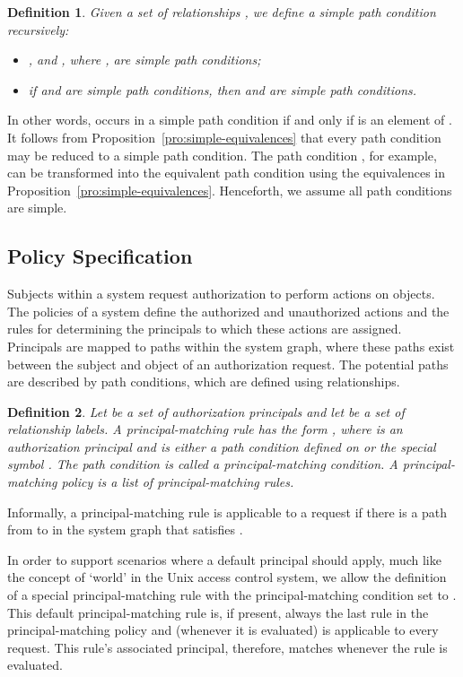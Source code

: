 \documentclass{article}
\newtheorem{definition}{Definition}
\begin{document}
\begin{definition}
   Given a set of relationships , we define a \emph{simple path condition} recursively:
    \begin{itemize}
	\item ,  and , where , are simple path conditions;
        \item if  and  are simple path conditions, then  and  are simple path conditions.
    \end{itemize}
\end{definition}

In other words,  occurs in a simple path condition if and only if  is an element of .
It follows from Proposition~\ref{pro:simple-equivalences} that every path condition may be reduced to a simple path condition.
The path condition , for example, can be transformed into the equivalent path condition  using the equivalences in Proposition~\ref{pro:simple-equivalences}.
Henceforth, we assume all path conditions are simple.


\subsection{Policy Specification}\label{sec:AuthZModel:PolicySpec}

Subjects within a system request authorization to perform actions on objects. The policies of a system define the authorized and unauthorized actions and the rules for determining the principals to which these actions are assigned. Principals are mapped to paths within the system graph, where these paths exist between the subject and object of an authorization request. The potential paths are described by path conditions, which are defined using relationships.

\begin{definition}
     Let  be a set of \emph{authorization principals} and let  be a set of relationship labels.
     A \emph{principal-matching rule} has the form , where  is an authorization principal and  is either a path condition defined on  or the special symbol .
     The path condition  is called a \emph{principal-matching condition}. A \emph{principal-matching policy}  is a list of principal-matching rules.
\end{definition}

Informally, a principal-matching rule  is applicable to a request  if there is a path from  to  in the system graph that satisfies .

In order to support scenarios where a default principal should apply, much like the concept of `world' in the Unix access control system, we allow the definition of a special principal-matching rule with the principal-matching condition set to .
This default principal-matching rule is, if present, always the last rule in the principal-matching policy and (whenever it is evaluated) is applicable to every request.
This rule's associated principal, therefore, matches whenever the rule is evaluated.
\end{document}
